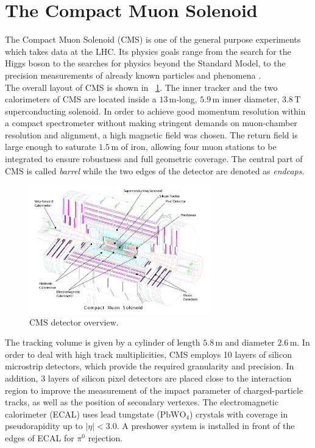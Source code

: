 \section{The Compact Muon Solenoid}\label{sec:cms}
The Compact Muon Solenoid (CMS) is one of the general purpose experiments which takes data at the LHC. Its physics goals range from the search for the Higgs boson to the searches for physics beyond the Standard Model, to the precision measurements of already known particles and phenomena \cite{CMS_Detector}. \\
The overall layout of CMS is shown in \figurename~\ref{CMS_Layout}. The inner tracker and the two calorimeters of CMS are located inside a $13\,$m-long, $5.9 \,$m inner diameter, $3.8\, $T superconducting solenoid. In order to achieve good momentum resolution within a compact spectrometer  without making stringent demands on muon-chamber resolution and alignment, a high magnetic field was chosen. The return field is large enough to saturate $1.5 \,$m of iron, allowing four muon stations to be integrated to ensure robustness and full geometric coverage. The central part of CMS is called \emph{barrel} while the two edges of the detector are denoted as \emph{endcaps}.
\begin{figure}[htbp]
\centering
\includegraphics[width=0.7\textwidth]{Images/CMS_Layout.pdf}
\caption{CMS detector overview.}
\label{CMS_Layout}
\end{figure}
The tracking volume is given by a cylinder of length $5.8 \,$m and diameter $2.6 \,$m. In order to deal with high track multiplicities, CMS employs 10 layers of silicon microstrip detectors, which provide the required granularity and precision. In addition, 3 layers of silicon pixel detectors are placed close to the interaction region to improve the measurement of the impact parameter of charged-particle tracks, as well as the position of secondary vertexes. The electromagnetic calorimeter (ECAL) uses lead tungstate ($\mathrm{PbWO_4}$) crystals with coverage in pseudorapidity up to $|\eta| < 3.0$.  A preshower system is installed in front of the edges of ECAL for $\pi^0$ rejection.

